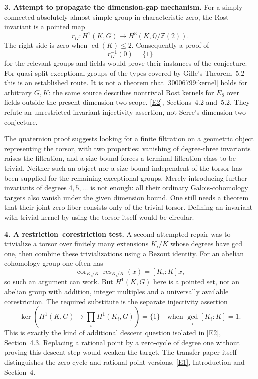 \documentclass[11pt,a4paper]{article}
\newcommand{\Z}{\mathbb{Z}}
\newcommand{\Q}{\mathbb{Q}}
\newcommand{\eref}[2]{\hyperlink{extra:#1:#2}{[E#2]}}
\numberwithin{equation}{section}
\begin{document}
\textbf{3. Attempt to propagate the dimension-gap mechanism.}
For a simply connected absolutely almost simple group in characteristic
zero, the Rost invariant is a pointed map
\[
 r_G:H^1(K,G)\longrightarrow H^3(K,\Q/\Z(2)).
\]
The right side is zero when $\operatorname{cd}(K)\le2$.
Consequently a proof of
\begin{equation}\label{30006799:kernel}
 r_G^{-1}(0)=\{1\}
\end{equation}
for the relevant groups and fields would prove their instances of the
conjecture. For quasi-split exceptional groups of the types covered by
Gille's Theorem~5.2 this is an established route. It is not a theorem
that \eqref{30006799:kernel} holds for arbitrary $G,K$: the same source
describes nontrivial Rost kernels for $E_8$ over fields outside the
present dimension-two scope. \eref{30006799}{2}, Sections~4.2 and~5.2.
They refute an unrestricted invariant-injectivity assertion, not
Serre's dimension-two conjecture.

The quaternion proof suggests looking for a finite filtration on a
geometric object representing the torsor, with two properties: vanishing
of degree-three invariants raises the filtration, and a size bound
forces a terminal filtration class to be trivial. Neither such an
object nor a size bound independent of the torsor has been supplied
for the remaining exceptional groups. Merely introducing further
invariants of degrees $4,5,\ldots$ is not enough: all their ordinary
Galois-cohomology targets also vanish under the given dimension bound.
One still needs a theorem that their joint zero fiber consists only of
the trivial torsor. Defining an invariant with trivial kernel by using
the torsor itself would be circular.

\textbf{4. A restriction--corestriction test.}
A second attempted repair was to trivialize a torsor over finitely many
extensions $K_i/K$ whose degrees have gcd one, then combine these
trivializations using a Bezout identity. For an abelian cohomology group
one often has
\[
 \operatorname{cor}_{K_i/K}\operatorname{res}_{K_i/K}(x)
          =[K_i:K]x,
\]
so such an argument can work. But $H^1(K,G)$ here is a pointed set,
not an abelian group with addition, integer multiples and a universally
available corestriction. The required substitute is the separate
injectivity assertion
\[
 \ker\left(H^1(K,G)\to\prod_i H^1(K_i,G)\right)=\{1\}
        \quad\text{when }\gcd_i[K_i:K]=1.
\]
This is exactly the kind of additional descent question isolated in
\eref{30006799}{2}, Section~4.3. Replacing a rational point by a zero-cycle
of degree one without proving this descent step would weaken the target.
The transfer paper itself distinguishes the zero-cycle and rational-point
versions. \eref{30006799}{1}, Introduction and Section~4.
\end{document}
